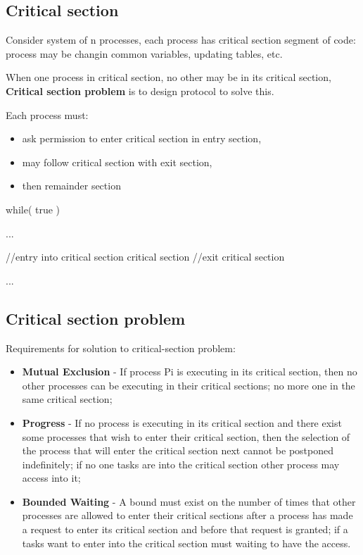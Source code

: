 \newpage
\subsection{Critical section}
Consider system of n processes, each process has critical section segment of code: process may be changin common variables, updating tables, etc.

When one process in critical section, no other may be in its critical section, \textbf{Critical section problem} is to design protocol to solve this.

Each process must:

\begin{itemize}
    \item ask permission to enter critical section in entry section,
    \item may follow critical section with exit section,
    \item then remainder section
\end{itemize}

\begin{codeInC}
while( true ){
    ...
    
    //entry into critical section
        critical section
    //exit critical section
    
    ...
}
\end{codeInC}


\subsection{Critical section problem}
Requirements for solution to critical-section problem:

\begin{itemize}
    \item \textbf{Mutual Exclusion} - If process Pi is executing in its critical section, then no other processes can be executing in their critical sections; no more one in the same critical section;
    \item \textbf{Progress} - If no process is executing in its critical section and there exist some processes that wish to enter their critical section, then the selection of the process that will enter the critical section next cannot be postponed indefinitely; if no one tasks are into the critical section other process may access into it;
    \item \textbf{Bounded Waiting} - A bound must exist on the number of times that other processes are allowed to enter their critical sections after a process has made a request to enter its critical section and before that request is granted; if a tasks want to enter into the critical section must waiting to have the access.
\end{itemize}


